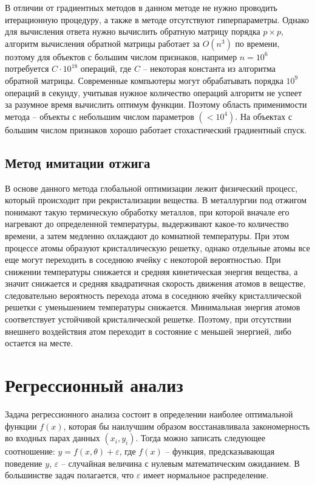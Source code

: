 В отличии от градиентных методов в данном методе не нужно проводить итерационную процедуру, а также в методе отсутствуют гиперпараметры. Однако для вычисления ответа нужно вычислить обратную матрицу порядка $p \times p$, алгоритм вычисления обратной матрицы работает за $O(n^3)$ по времени, поэтому для объектов с большим числом признаков, например $n=10^6$ потребуется $C \cdot 10^{18}$ операций, где $C$ -- некоторая константа из алгоритма обратной матрицы. Современные компьютеры могут обрабатывать порядка $10^9$ операций в секунду, учитывая нужное количество операций алгоритм не успеет за разумное время вычислить оптимум функции. Поэтому область применимости метода -- объекты с небольшим числом параметров $(< 10^4)$. На объектах с большим числом признаков хорошо работает стохастический градиентный спуск.


\subsection{Метод имитации отжига}

В основе данного метода глобальной оптимизации лежит физический процесс, который происходит при рекристализации вещества. В металлургии под отжигом понимают такую термическую обработку металлов, при которой вначале его нагревают до определенной температуры, выдерживают какое-то количество времени, а затем медленно охлаждают до комнатной температуры. При этом процессе атомы образуют кристаллическую решетку, однако отдельные атомы все еще могут переходить в соседнюю ячейку с некоторой вероятностью. При снижении температуры снижается и средняя кинетическая энергия вещества, а значит снижается и средняя квадратичная скорость движения атомов в веществе, следовательно вероятность перехода атома в соседнюю ячейку кристаллической решетки с уменьшением температуры снижается. Минимальная энергия атомов соответствует устойчивой кристалической решетке. Поэтому, при отсутствии внешнего воздействия атом переходит в состояние с меньшей энергией, либо остается на месте.



\section{Регрессионный анализ}

Задача регрессионного анализа состоит в определении наиболее оптимальной функции $f(x)$, которая бы наилучшим образом восстанавливала закономерность во входных парах данных $(x_i, y_i)$. Тогда можно записать следующее соотношение: $y = f(x, \theta) + \varepsilon$, где $f(x)$ -- функция, предсказывающая поведение $y$, $\varepsilon$ -- случайная величина с нулевым математическим ожиданием. В большинстве задач полагается, что $\varepsilon$ имеет нормальное распределение.

